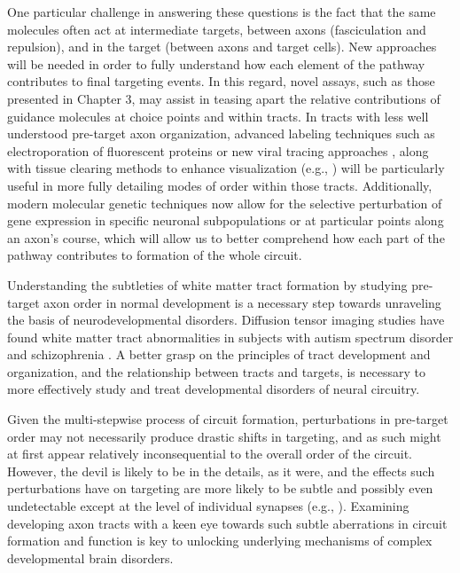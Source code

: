 One particular challenge in answering these questions is the fact that the same molecules often act at intermediate targets, between axons (fasciculation and repulsion), and in the target (between axons and target cells).
New approaches will be needed in order to fully understand how each element of the pathway contributes to final targeting events.
In this regard, novel \invitro{} assays, such as those presented in Chapter 3, may assist in teasing apart the relative contributions of guidance molecules at choice points and within tracts.
In tracts with less well understood pre-target axon organization, advanced labeling techniques such as electroporation of fluorescent proteins \cite{saito2001efficient} or new viral tracing approaches \cite{reardon2016rabies}, along with tissue clearing methods to enhance visualization (e.g., ) will be particularly useful in more fully detailing modes of order within those tracts.
Additionally, modern molecular genetic techniques now allow for the selective perturbation of gene expression in specific neuronal subpopulations or at particular points along an axon's course, which will allow us to better comprehend how each part of the pathway contributes to formation of the whole circuit.

Understanding the subtleties of white matter tract formation by studying pre-target axon order in normal development is a necessary step towards unraveling the basis of neurodevelopmental disorders.
Diffusion tensor imaging studies have found white matter tract abnormalities in subjects with autism spectrum disorder \cite{wolff2012differences} and schizophrenia \cite{kubicki2007review}.
A better grasp on the principles of tract development and organization, and the relationship between tracts and targets, is necessary to more effectively study and treat developmental disorders of neural circuitry.

Given the multi-stepwise process of circuit formation, perturbations in pre-target order may not necessarily produce drastic shifts in targeting, and as such might at first appear relatively inconsequential to the overall order of the circuit.
However, the devil is likely to be in the details, as it were, and the effects such perturbations have on targeting are more likely to be subtle and possibly even undetectable except at the level of individual synapses (e.g., ).
Examining developing axon tracts with a keen eye towards such subtle aberrations in circuit formation and function is key to unlocking underlying mechanisms of complex developmental brain disorders.

